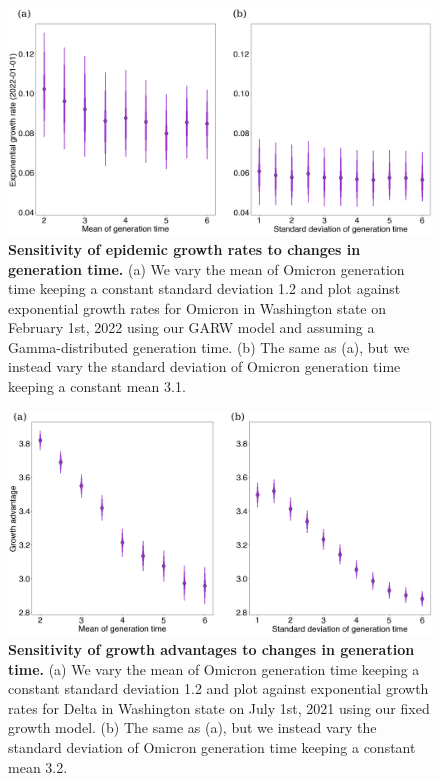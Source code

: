 \begin{figure}
  \centering
  \includegraphics[width=\linewidth]{figs/little_r_sensitivity.png}
  \caption[\textbf{Sensitivity of epidemic growth rates to changes in generation time.}]{
    \textbf{Sensitivity of epidemic growth rates to changes in generation time.}
(a) We vary the mean of Omicron generation time keeping a constant standard deviation 1.2 and plot against exponential growth rates for Omicron in Washington state on February 1st, 2022 using our GARW model and assuming a Gamma-distributed generation time.
(b) The same as (a), but we instead vary the standard deviation of Omicron generation time keeping a constant mean 3.1. }%
  \label{fig:little_r_sensitivity}
\end{figure}

\begin{figure}
  \centering
  \includegraphics[width=\linewidth]{figs/growth_advantage_sensitivity.png}
  \caption[\textbf{Sensitivity of growth advantages to changes in generation time.}]{
    \textbf{Sensitivity of growth advantages to changes in generation time.}
(a) We vary the mean of Omicron generation time keeping a constant standard deviation 1.2 and plot against exponential growth rates for Delta in Washington state on July 1st, 2021 using our fixed growth model.
(b) The same as (a), but we instead vary the standard deviation of Omicron generation time keeping a constant mean 3.2.}%
  \label{fig:growth_advantage_sensitivity}
\end{figure}

